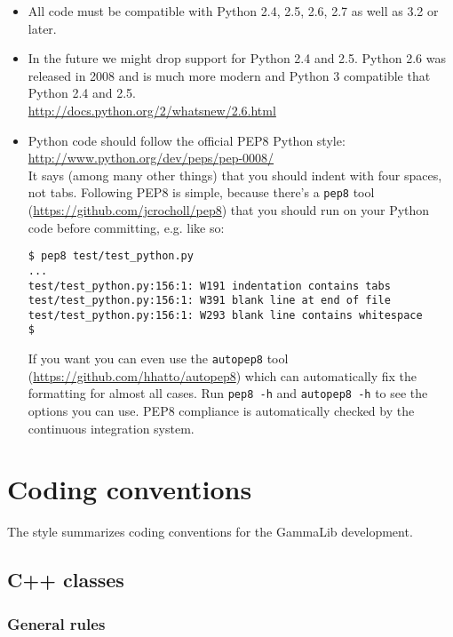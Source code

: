 \documentclass{article}[12pt,a4]
\begin{document}
\begin{itemize}
\item All code must be compatible with Python 2.4, 2.5, 2.6, 2.7 as well as 3.2 or later.
\item In the future we might drop support for Python 2.4 and 2.5. Python 2.6 was released in 2008 and
is much more modern and Python 3 compatible that Python 2.4 and 2.5.\\
\url{http://docs.python.org/2/whatsnew/2.6.html}
\item Python code should follow the official PEP8 Python style:\\
\url{http://www.python.org/dev/peps/pep-0008/}\\
It says (among many other things) that you should indent with four spaces, not tabs.
Following PEP8 is simple, because there's a {\tt pep8} tool (\url{https://github.com/jcrocholl/pep8}) that you should
run on your Python code before committing, e.g. like so:
\begin{verbatim}
$ pep8 test/test_python.py
...
test/test_python.py:156:1: W191 indentation contains tabs
test/test_python.py:156:1: W391 blank line at end of file
test/test_python.py:156:1: W293 blank line contains whitespace
$
\end{verbatim}
If you want you can even use the {\tt autopep8} tool (\url{https://github.com/hhatto/autopep8}) which can
automatically fix the formatting for almost all cases. Run {\tt pep8 -h} and {\tt autopep8 -h} to see
the options you can use.
PEP8 compliance is automatically checked by the continuous integration system.
\end{itemize}

\section{Coding conventions}

The style summarizes coding conventions for the GammaLib development.

\subsection{C++ classes}

\subsubsection{General rules}
\end{document}
